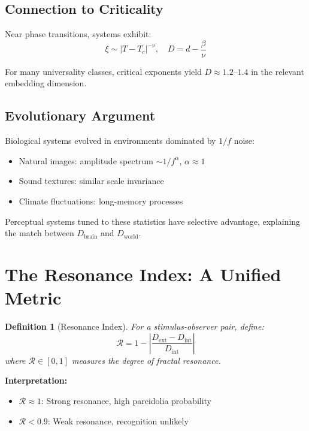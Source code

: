 \documentclass[11pt,a4paper]{article}
\newtheorem{definition}{Definition}
\begin{document}
\subsection{Connection to Criticality}

Near phase transitions, systems exhibit:
\begin{equation}
\xi \sim |T - T_c|^{-\nu}, \quad D = d - \frac{\beta}{\nu}
\end{equation}

For many universality classes, critical exponents yield $D \approx 1.2$--$1.4$ in the relevant embedding dimension.

\subsection{Evolutionary Argument}

Biological systems evolved in environments dominated by $1/f$ noise:
\begin{itemize}
    \item Natural images: amplitude spectrum $\sim 1/f^\alpha$, $\alpha \approx 1$
    \item Sound textures: similar scale invariance
    \item Climate fluctuations: long-memory processes
\end{itemize}

Perceptual systems tuned to these statistics have selective advantage, explaining the match between $D_{\text{brain}}$ and $D_{\text{world}}$.

\section{The Resonance Index: A Unified Metric}

\begin{definition}[Resonance Index]
For a stimulus-observer pair, define:
\begin{equation}
\boxed{\mathcal{R} = 1 - \left|\frac{D_{\text{ext}} - D_{\text{int}}}{D_{\text{int}}}\right|}
\end{equation}
where $\mathcal{R} \in [0, 1]$ measures the degree of fractal resonance.
\end{definition}

\textbf{Interpretation:}
\begin{itemize}
    \item $\mathcal{R} \approx 1$: Strong resonance, high pareidolia probability
    \item $\mathcal{R} < 0.9$: Weak resonance, recognition unlikely
\end{itemize}
\end{document}

